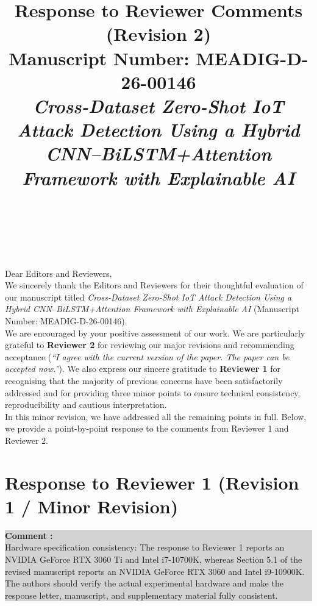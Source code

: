 \documentclass[11pt]{article}
\title{\textbf{Response to Reviewer Comments (Revision 2)}\\
\large Manuscript Number: MEADIG-D-26-00146\\
\small \textit{Cross-Dataset Zero-Shot IoT Attack Detection Using a Hybrid CNN--BiLSTM+Attention Framework with Explainable AI}}
\author{~}
\date{~}
\newcounter{commentcnt}
\newcommand{\question}[1]{
  \stepcounter{commentcnt}
  \vspace{1.5em}
  \noindent
  \colorbox{lightgray}{
    \parbox{\dimexpr\textwidth-2\fboxsep\relax}{
      \color{darkgreen}
      \textbf{Comment \thecommentcnt:} \\
      #1
    }
  }
  \vspace{0.5em}
}
\begin{document}
\maketitle

Dear Editors and Reviewers,\\

We sincerely thank the Editors and Reviewers for their thoughtful evaluation of our manuscript titled \textit{Cross-Dataset Zero-Shot IoT Attack Detection Using a Hybrid CNN--BiLSTM+Attention Framework with Explainable AI} (Manuscript Number: MEADIG-D-26-00146).\\

We are encouraged by your positive assessment of our work. We are particularly grateful to \textbf{Reviewer 2} for reviewing our major revisions and recommending acceptance (\textit{``I agree with the current version of the paper. The paper can be accepted now.''}). We also express our sincere gratitude to \textbf{Reviewer 1} for recognising that the majority of previous concerns have been satisfactorily addressed and for providing three minor points to ensure technical consistency, reproducibility and cautious interpretation.\\

In this minor revision, we have addressed all the remaining points in full. Below, we provide a point-by-point response to the comments from Reviewer 1 and Reviewer 2.

\section*{Response to Reviewer 1 (Revision 1 / Minor Revision)}
\setcounter{commentcnt}{0}

\question{Hardware specification consistency: The response to Reviewer 1 reports an NVIDIA GeForce RTX 3060 Ti and Intel i7-10700K, whereas Section 5.1 of the revised manuscript reports an NVIDIA GeForce RTX 3060 and Intel i9-10900K. The authors should verify the actual experimental hardware and make the response letter, manuscript, and supplementary material fully consistent.}
\end{document}
